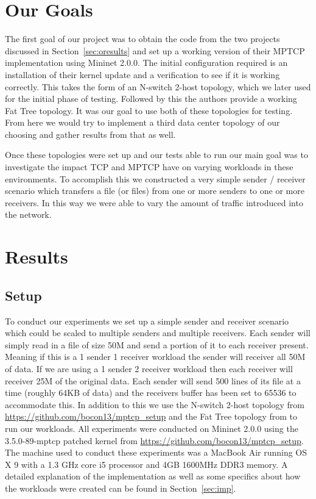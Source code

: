 \documentclass[10pt]{report}
\begin{document}
\section{Our Goals}
The first goal of our project was to obtain the code from the two
projects discussed in Section~\ref{sec:oresults} and set up a working
version of their MPTCP implementation using Mininet 2.0.0. The initial
configuration required is an installation of their kernel update and a
verification to see if it is working correctly. This takes the form of
an N-switch 2-host topology, which we later used for the initial
phase of testing. Followed by
this the authors provide a working Fat Tree topology. It was our goal
to use both of these topologies for testing. From here we would try to
implement a third data center topology of our choosing and gather
results from that as well.

Once these topologies were set up and our tests able to run our main
goal was to investigate the impact TCP and MPTCP have on varying
workloads in these environments. To accomplish this we constructed
a very simple sender / receiver scenario which transfers a file (or
files) from one or more senders to one or more receivers. In this way
we were able to vary the amount of traffic introduced into the network.

\section{Results}
\subsection{Setup}
To conduct our experiments we set up a simple sender and receiver
scenario which could be scaled to multiple senders and multiple
receivers. Each sender will simply read in a file of size 50M and send
a portion of it to each receiver present. Meaning if this is a 1
sender 1 receiver workload the sender will receiver all 50M of
data. If we are using a 1 sender 2 receiver workload then each receiver
will receiver 25M of the original data. Each sender will send 500
lines of its file at a time (roughly 64KB of data) and the receivers
buffer has been set to 65536 to accommodate this. In addition to this
we use the N-switch 2-host topology from
\url{https://github.com/bocon13/mptcp_setup} and the Fat Tree topology
from \cite{datacenter} to run our workloads. All experiments were
conducted on Mininet 2.0.0 using the 3.5.0-89-mptcp patched kernel
from \url{https://github.com/bocon13/mptcp_setup}. The machine used to
conduct these experiments was a MacBook Air running OS X 9 with a 1.3
GHz core i5 processor and 4GB 1600MHz DDR3 memory. A detailed
explanation of the implementation as well as some specifics about how
the workloads were created can be found in
Section~\ref{sec:imp}. 
\end{document}
